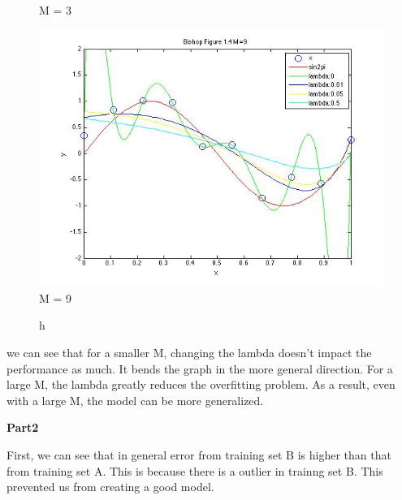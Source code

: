 \begin{figure}[!htb]
  \caption{M = 3}\label{fig:figures/p3_bishop_m=3}
\endminipage\hfill
{}%
  \includegraphics[width=\linewidth]{figures/p3_bishop_m=9}
  \caption{M = 9}\label{fig:figures/p3_bishop_m=9}
\endminipage\hfill

\end{figure}



\begin{figure}{h}
\end{figure}





we can see that for a smaller M, changing the lambda doesn't impact the performance as much. It bends the graph in the more general direction. For a large M, the lambda greatly reduces the overfitting problem. As a result, even with a large M, the model can be more generalized. 

{\bfseries Part2}

First, we can see that in general error from training set B is higher than that from training set A. 
This is because there is a outlier in trainng set B. This prevented us from creating a good model. 


